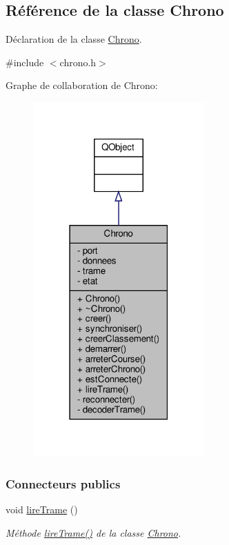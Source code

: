 \hypertarget{class_chrono}{}\subsection{Référence de la classe Chrono}
\label{class_chrono}


Déclaration de la classe \hyperlink{class_chrono}{Chrono}.  




{\ttfamily \#include $<$chrono.\+h$>$}



Graphe de collaboration de Chrono\+:\nopagebreak
\begin{figure}[H]
\begin{center}
\leavevmode
\includegraphics[width=186pt]{class_chrono__coll__graph}
\end{center}
\end{figure}
\subsubsection*{Connecteurs publics}
\begin{DoxyCompactItemize}
\item 
void \hyperlink{class_chrono_ae7c3c8494ace02f4c9dd714f6f0e574a}{lire\+Trame} ()
\begin{DoxyCompactList}\small\item\em Méthode \hyperlink{class_chrono_ae7c3c8494ace02f4c9dd714f6f0e574a}{lire\+Trame()} de la classe \hyperlink{class_chrono}{Chrono}. \end{DoxyCompactList}\end{DoxyCompactItemize}
